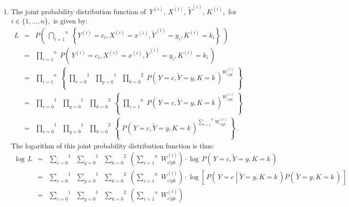 \proof
\begin{enumerate}
\item
The joint probability distribution function of
\,$Y^{(i)}$, $X^{(i)}$, $\widetilde{Y}^{(i)}$, $K^{(i)}$,
\,for \,$i \in \{1,\ldots,n\}$,
\,is given by:
\begin{eqnarray*}
L &=&
	P\!\left(\;
		\overset{n}{\underset{i=1}{\bigcap}}\;
		\left\{
			Y^{(i)}=c_{i},X^{(i)}=x^{(i)},\widetilde{Y}^{(i)}=y_{i},K^{(i)}=k_{i}
		\right\}
	\;\right)
\\
&=&
	\overset{n}{\underset{i=1}{\prod}} \;
	P\!\left(\,Y^{(i)}=c_{i},X^{(i)}=x^{(i)},\widetilde{Y}^{(i)}=y_{i},K^{(i)}=k_{i}\,\right)
\\
&=&
	\overset{n}{\underset{i=1}{\prod}} \;
	\left\{\;
		\overset{1}{\underset{c=0}{\prod}}\;\;
		\overset{1}{\underset{y=0}{\prod}}\;\;
		\overset{2}{\underset{k=0}{\prod}}\;
		P\!\left(\,Y=c,\widetilde{Y}=y,K=k\,\right)^{W^{(i)}_{c \vert yk}}
	\;\right\}
\\
&=&
	\overset{1}{\underset{c=0}{\prod}}\;\;
	\overset{1}{\underset{y=0}{\prod}}\;\;
	\overset{2}{\underset{k=0}{\prod}}\;
	\left\{\;
		\overset{n}{\underset{i=1}{\prod}} \;
		P\!\left(\,Y=c,\widetilde{Y}=y,K=k\,\right)^{W^{(i)}_{c \vert yk}}
	\;\right\}
\\
&=&
	\overset{1}{\underset{c=0}{\prod}}\;\;
	\overset{1}{\underset{y=0}{\prod}}\;\;
	\overset{2}{\underset{k=0}{\prod}}\;
	\left\{\;
		P\!\left(\,Y=c,\widetilde{Y}=y,K=k\,\right)
		^{\overset{n}{\underset{i=1}{\sum}}\,W^{(i)}_{c \vert yk}}
	\;\right\}\,.
\end{eqnarray*}
The logarithm of this joint probability distribution function is thus:
\begin{eqnarray*}
\log\,L &=&
	\overset{1}{\underset{c=0}{\sum}}\;\;
	\overset{1}{\underset{y=0}{\sum}}\;\;
	\overset{2}{\underset{k=0}{\sum}}\;
	\left(\overset{n}{\underset{i=1}{\sum}}\;W^{(i)}_{c \vert yk}\right)
	\cdot
	\log\,P\!\left(\,Y=c,\widetilde{Y}=y,K=k\,\right)
\\
&=&
	\overset{1}{\underset{c=0}{\sum}}\;\;
	\overset{1}{\underset{y=0}{\sum}}\;\;
	\overset{2}{\underset{k=0}{\sum}}\;
	\left(\overset{n}{\underset{i=1}{\sum}}\;W^{(i)}_{c \vert yk}\right)
	\cdot
	\log\left[\,
		P\!\left(\,Y=c\;\left\vert\;\widetilde{Y}=y,K=k\right.\,\right)
		P\!\left(\,\widetilde{Y}=y,K=k\,\right)
	\,\right]
\\
&=&
	\overset{1}{\underset{c=0}{\sum}}\;\;
	\overset{1}{\underset{y=0}{\sum}}\;\;
	\overset{2}{\underset{k=0}{\sum}}\;
	\left(\overset{n}{\underset{i=1}{\sum}}\;W^{(i)}_{c \vert yk}\right)

\end{eqnarray*}
\end{enumerate}
